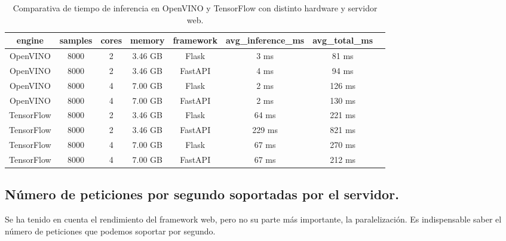 \begin{table}[H]
    \begin{center}
        \small
        \begin{tabular}{ | c | c | c | c| c | c | c | c |}
            \hline
            engine & samples & cores & memory & framework & avg\_inference\_ms & avg\_total\_ms \\ \hline
            OpenVINO & 8000 & 2 & 3.46 GB & Flask & 3 ms & 81 ms \\
            OpenVINO & 8000 & 2 & 3.46 GB & FastAPI & 4 ms & 94 ms \\
            OpenVINO & 8000 & 4 & 7.00 GB & Flask & 2 ms & 126 ms \\
            OpenVINO & 8000 & 4 & 7.00 GB & FastAPI & 2 ms & 130 ms \\
            TensorFlow & 8000 & 2 & 3.46 GB & Flask & 64 ms & 221 ms \\
            TensorFlow & 8000 & 2 & 3.46 GB & FastAPI & 229 ms & 821 ms \\
            TensorFlow & 8000 & 4 & 7.00 GB & Flask & 67 ms & 270 ms \\
            TensorFlow & 8000 & 4 & 7.00 GB & FastAPI & 67 ms & 212 ms \\ \hline
        \end{tabular}
    \end{center}
    \caption{Comparativa de tiempo de inferencia en OpenVINO y TensorFlow con distinto hardware y servidor web.}
    \label{tab:Comparativa de tiempo de inferencia con OpenVINO y TensorFlow con distinto hardware y servidor web}
\end{table}




\subsection{Número de peticiones por segundo soportadas por el servidor.}
Se ha tenido en cuenta el rendimiento del framework web, pero no su parte más importante, la paralelización. Es indispensable saber el número de peticiones que podemos soportar por segundo.

